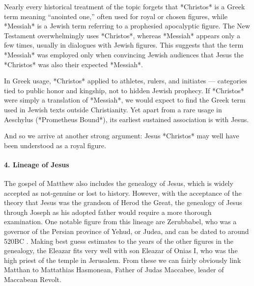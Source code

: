 Nearly every historical treatment of the topic forgets that *Christos* is a Greek term meaning “anointed one,” often used for royal or chosen figures, while *Messiah* is a Jewish term referring to a prophesied apocalyptic figure.
The New Testament overwhelmingly uses *Christos*, whereas *Messiah* appears only a few times, usually in dialogues with Jewish figures.
This suggests that the term *Messiah* was employed only when convincing Jewish audiences that Jesus the *Christos* was also their expected *Messiah*.

In Greek usage, *Christos* applied to athletes, rulers, and initiates — categories tied to public honor and kingship, not to hidden Jewish prophecy.
If *Christos* were simply a translation of *Messiah*, we would expect to find the Greek term used in Jewish texts outside Christianity.
Yet apart from a rare usage in Aeschylus (*Prometheus Bound*), its earliest sustained association is with Jesus.

And so we arrive at another strong argument: Jesus *Christos* may well have been understood as a royal figure.

\paragraph{4.
Lineage of Jesus}\label{par:lineage-of-jesus}

The gospel of Matthew also includes the genealogy of Jesus, which is widely accepted as not-genuine or lost to history.
However, with the acceptance of the theory that Jesus was the grandson of Herod the Great, the genealogy of Jesus through Joseph as his adopted father would require a more thorough examination.
One notable figure from this lineage are Zerubbabel, who was a governor of the Persian province of Yehud, or Judea, and can be dated to around 520BC .
Making best guess estimates to the years of the other figures in the genealogy, the Eleazar fits very well with son Eleazar of Onias I, who was the high priest of the temple in Jerusalem.
From these we can fairly obviously link Matthan to Mattathias Hasmonean, Father of Judas Maccabee, leader of Maccabean Revolt.


